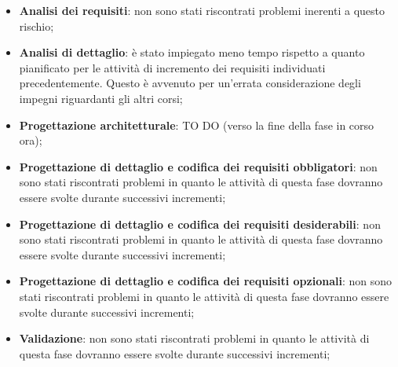 			\begin{itemize}
				\item \textbf{Analisi dei requisiti}: non sono stati riscontrati problemi inerenti a questo rischio;
				\item \textbf{Analisi di dettaglio}: è stato impiegato meno tempo rispetto a quanto pianificato per le attività di incremento dei requisiti individuati precedentemente. Questo è avvenuto per un'errata considerazione degli impegni riguardanti gli altri corsi;
				\item \textbf{Progettazione architetturale}: TO DO (verso la fine della fase in corso ora);
				\item \textbf{Progettazione di dettaglio e codifica dei requisiti obbligatori}: non sono stati riscontrati problemi in quanto le attività di questa fase dovranno essere svolte durante successivi incrementi;
				\item \textbf{Progettazione di dettaglio e codifica dei requisiti desiderabili}: non sono stati riscontrati problemi in quanto le attività di questa fase dovranno essere svolte durante successivi incrementi;
				\item \textbf{Progettazione di dettaglio e codifica dei requisiti opzionali}: non sono stati riscontrati problemi in quanto le attività di questa fase dovranno essere svolte durante successivi incrementi;
				\item \textbf{Validazione}: non sono stati riscontrati problemi in quanto le attività di questa fase dovranno essere svolte durante successivi incrementi;
			\end{itemize}



	\newpage
